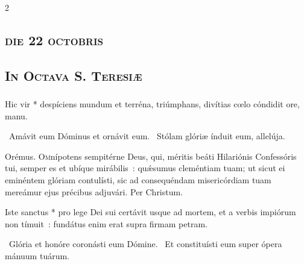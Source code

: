 \documentclass[9pt,twoside]{extarticle}
\begin{document}
\begin{multicols}{2}
\subsection*{\center \normalfont \textsc{die 22 octobris}}
\subsection*{\center \textsc{In Octava S. Teresiæ}}
\subsubsection*{\center {}}

\smallskip
\small {}


\normalsize
{} Hic vir * despíciens mundum et terréna, triúmphans, divítias cœlo cóndidit ore, manu.

~Amávit eum Dóminus et ornávit eum. ~Stólam glóriæ índuit eum, allelúja.

\smallskip
Orémus. \hfill {}
\lettrine{O}mnípotens sempitérne Deus, qui, méritis beáti Hilariónis Confessóris tui, semper es et ubíque mirábilis~: quǽsumus cleméntiam tuam; ut sicut ei eminéntem glóriam contulísti, sic ad consequéndam misericórdiam tuam mereámur ejus précibus adjuvári. Per Christum.

{\small {}}

 Iste sanctus * pro lege Dei sui certávit usque ad mortem, et a verbis impiórum non tímuit~: fundátus enim erat supra firmam petram.

~Glória et honóre coronásti eum Dómine. ~Et constituísti eum super ópera mánuum tuárum.


\end{multicols}
\end{document}
